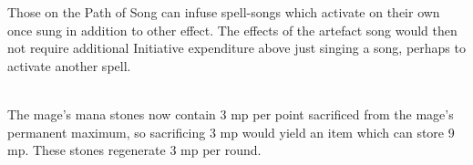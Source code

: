 \documentclass[titlepage,a4paper,openany]{book}
\begin{document}
\begin{multicols}{2}
Those on the Path of Song can infuse spell-songs which activate on their own once sung in addition to other effect. The effects of the artefact song would then not require additional Initiative expenditure above just singing a song, perhaps to activate another spell.

\spelllevel

\\
The mage's mana stones now contain 3 \gls{mp} per point sacrificed from the mage's permanent maximum, so sacrificing 3 \gls{mp} would yield an item which can store 9 \gls{mp}. These stones regenerate 3 \gls{mp} per \gls{round}.

\end{multicols}

\end{document}
